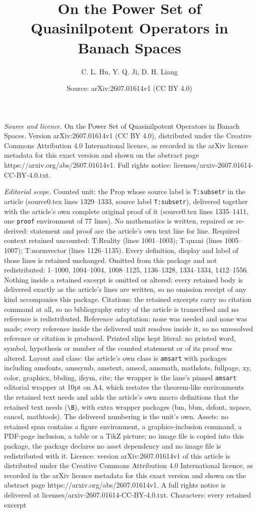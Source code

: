 \documentclass[10pt,a4paper]{amsart}
\title[On the Power Set of Quasinilpotent Operators in Banach Space]{On the Power Set of Quasinilpotent Operators in Banach Spaces}
\author{C. L. Hu, Y. Q. Ji, D. H. Liang}
\date{Source: arXiv:2607.01614v1 (CC BY 4.0)}
\begin{document}
\maketitle

\noindent\emph{Source and licence.} On the Power Set of Quasinilpotent Operators in Banach Spaces. Version arXiv:2607.01614v1 (CC BY 4.0), distributed under the Creative Commons Attribution 4.0 International licence, as recorded in the arXiv licence metadata for this exact version and shown on the abstract page https://arxiv.org/abs/2607.01614v1. Full rights notice: licenses/arxiv-2607.01614-CC-BY-4.0.txt.\par\smallskip

\noindent\textit{Editorial scope.} Counted unit: the Prop whose source label is \texttt{T:subsetr} in the article (source0.tex lines 1329--1333, source label \texttt{T:subsetr}), delivered together with the article's own complete original proof of it (source0.tex lines 1335--1411, one \texttt{proof} environment of 77 lines). No mathematics is written, repaired or re-derived: statement and proof are the article's own text line for line. Required context retained uncounted: T:Reality (lines 1001--1003); T:quani (lines 1005--1007); T:normvector (lines 1126--1135). Every definition, display and label of those lines is retained unchanged. Omitted from this package and not redistributed: 1--1000, 1004--1004, 1008--1125, 1136--1328, 1334--1334, 1412--1556. Nothing inside a retained excerpt is omitted or altered: every retained body is delivered exactly as the article's lines are written, so no omission receipt of any kind accompanies this package. Citations: the retained excerpts carry no citation command at all, so no bibliography entry of the article is transcribed and no reference is redistributed. Reference adaptation: none was needed and none was made; every reference inside the delivered unit resolves inside it, so no unresolved reference or citation is produced. Printed slips kept literal: no printed word, symbol, hypothesis or number of the counted statement or of its proof was altered. Layout and class: the article's own class is \texttt{amsart} with packages including amsfonts, amssymb, amstext, amscd, amsmath, mathdots, fullpage, xy, color, graphicx, bbding, ifsym, cite; the wrapper is the lane's pinned \texttt{amsart} editorial wrapper at 10pt on A4, which restates the theorem-like environments the retained text needs and adds the article's own macro definitions that the retained text needs (\texttt{\textbackslash B}), with extra wrapper packages (bm, bbm, dsfont, xspace, cancel, mathtools). The delivered numbering is the unit's own. Assets: no retained span contains a figure environment, a graphics-inclusion command, a PDF-page inclusion, a table or a TikZ picture; no image file is copied into this package, the package declares no asset dependency and no image file is redistributed with it. Licence: version arXiv:2607.01614v1 of this article is distributed under the Creative Commons Attribution 4.0 International licence, as recorded in the arXiv licence metadata for this exact version and shown on the abstract page https://arxiv.org/abs/2607.01614v1. A full rights notice is delivered at licenses/arxiv-2607.01614-CC-BY-4.0.txt. Characters: every retained excerpt 
\end{document}
